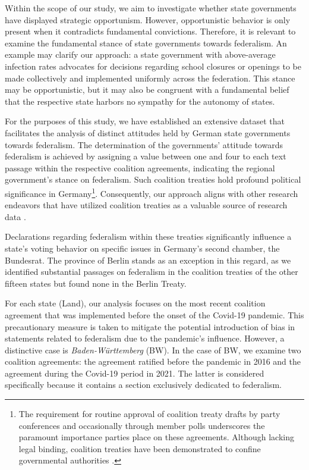 Within the scope of our study, we aim to investigate whether state governments have displayed strategic opportunism. However, opportunistic behavior is only present when it contradicts fundamental convictions. Therefore, it is relevant to examine the fundamental stance of state governments towards federalism. An example may clarify our approach: a state government with above-average infection rates advocates for decisions regarding school closures or openings to be made collectively and implemented uniformly across the federation. This stance may be opportunistic, but it may also be congruent with a fundamental belief that the respective state harbors no sympathy for the autonomy of states.

For the purposes of this study, we have established an extensive dataset that facilitates the analysis of distinct attitudes held by German state governments towards federalism. The determination of the governments' attitude towards federalism is achieved by assigning a value between one and four to each text passage within the respective coalition agreements, indicating the regional government's stance on federalism. Such coalition treaties hold profound political significance in Germany\footnote{
    The requirement for routine approval of coalition treaty drafts by party conferences and occasionally through member polls underscores the paramount importance parties place on these agreements. Although lacking legal binding, coalition treaties have been demonstrated to confine governmental authorities \citep{Schermann2014, Baeck2017}. 
}. Consequently, our approach aligns with other research endeavors that have utilized coalition treaties as a valuable source of research data \citep{Bowler2016, Daeubler2009, Kluever2019}. 

Declarations regarding federalism within these treaties significantly influence a state's voting behavior on specific issues in Germany's second chamber, the Bundesrat.  The province of Berlin stands as an exception in this regard, as we identified substantial passages on federalism in the coalition treaties of the other fifteen states but found none in the Berlin Treaty.
	
For each state (Land), our analysis focuses on the most recent coalition agreement that was implemented before the onset of the Covid-19 pandemic. This precautionary measure is taken to mitigate the potential introduction of bias in statements related to federalism due to the pandemic's influence. However, a distinctive case is \textit{Baden-Württemberg} (BW). In the case of BW, we examine two coalition agreements: the agreement ratified before the pandemic in 2016 and the agreement during the Covid-19 period in 2021. The latter is considered specifically because it contains a section exclusively dedicated to federalism.

